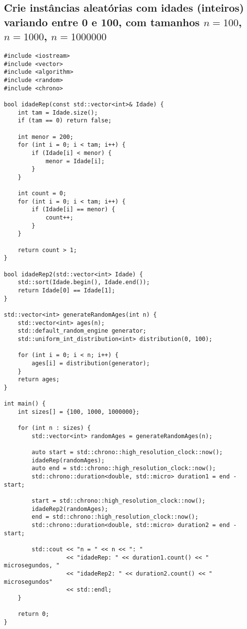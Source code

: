 \subsection{Crie instâncias aleatórias com idades (inteiros) variando entre 0 e 100, com tamanhos \( n = 100 \), \( n = 1000 \), \( n = 1000000 \)}

\begin{verbatim}
#include <iostream>
#include <vector>
#include <algorithm>
#include <random>
#include <chrono>

bool idadeRep(const std::vector<int>& Idade) {
    int tam = Idade.size();
    if (tam == 0) return false;

    int menor = 200;  
    for (int i = 0; i < tam; i++) {
        if (Idade[i] < menor) {
            menor = Idade[i];
        }
    }

    int count = 0;
    for (int i = 0; i < tam; i++) {
        if (Idade[i] == menor) {
            count++;
        }
    }

    return count > 1; 
}

bool idadeRep2(std::vector<int> Idade) {
    std::sort(Idade.begin(), Idade.end());
    return Idade[0] == Idade[1];
}

std::vector<int> generateRandomAges(int n) {
    std::vector<int> ages(n);
    std::default_random_engine generator;
    std::uniform_int_distribution<int> distribution(0, 100);

    for (int i = 0; i < n; i++) {
        ages[i] = distribution(generator);
    }
    return ages;
}

int main() {
    int sizes[] = {100, 1000, 1000000};

    for (int n : sizes) {
        std::vector<int> randomAges = generateRandomAges(n);
        
        auto start = std::chrono::high_resolution_clock::now();
        idadeRep(randomAges);
        auto end = std::chrono::high_resolution_clock::now();
        std::chrono::duration<double, std::micro> duration1 = end - start;

        start = std::chrono::high_resolution_clock::now();
        idadeRep2(randomAges);
        end = std::chrono::high_resolution_clock::now();
        std::chrono::duration<double, std::micro> duration2 = end - start;

        std::cout << "n = " << n << ": "
                  << "idadeRep: " << duration1.count() << " microsegundos, "
                  << "idadeRep2: " << duration2.count() << " microsegundos" 
                  << std::endl;
    }

    return 0;
}

\end{verbatim}